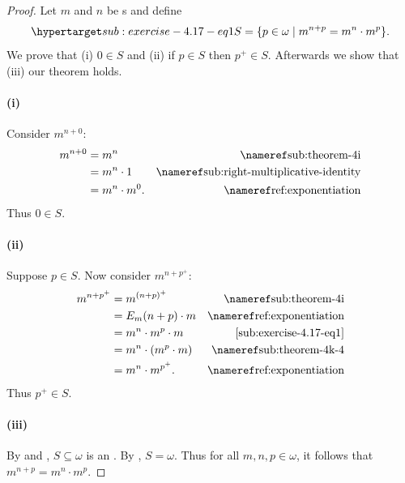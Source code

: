 \documentclass{report}
\begin{document}
  \begin{proof}

    Let $m$ and $n$ be s and define
      \begin{equation}
        \hyperlabel{sub:exercise-4.17-eq1}
        S = \{p \in \omega \mid m^{n+p} = m^n \cdot m^p\}.
      \end{equation}
    We prove that (i) $0 \in S$ and (ii) if $p \in S$ then $p^+ \in S$.
    Afterwards we show that (iii) our theorem holds.

    \paragraph{(i)}%

      Consider $m^{n+0}$:
        \begin{align*}
          m^{n+0}
            & = m^n & \textref{sub:theorem-4i} \\
            & = m^n \cdot 1 & \textref{sub:right-multiplicative-identity} \\
            & = m^n \cdot m^0. & \textref{ref:exponentiation}
        \end{align*}
      Thus $0 \in S$.

    \paragraph{(ii)}%

      Suppose $p \in S$.
      Now consider $m^{n+p^+}$:
        \begin{align*}
          m^{n+p^+}
            & = m^{(n + p)^+} & \textref{sub:theorem-4i} \\
            & = E_m(n + p) \cdot m & \textref{ref:exponentiation} \\
            & = m^n \cdot m^p \cdot m & \eqref{sub:exercise-4.17-eq1} \\
            & = m^n \cdot (m^p \cdot m) & \textref{sub:theorem-4k-4} \\
            & = m^n \cdot m^{p^+}. & \textref{ref:exponentiation}
        \end{align*}
      Thus $p^+ \in S$.

    \paragraph{(iii)}%

      By  and ,
        $S \subseteq \omega$ is an .
      By , $S = \omega$.
      Thus for all $m, n, p \in \omega$, it follows that
        $m^{n+p} = m^n \cdot m^p$.

  \end{proof}
\end{document}
